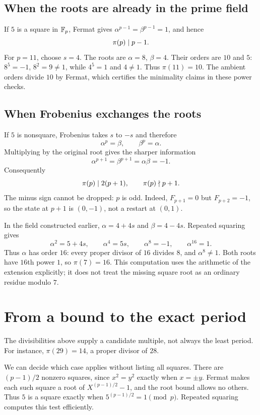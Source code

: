 \subsection*{When the roots are already in the prime field}

If $5$ is a square in $\mathbb F_p$, Fermat gives
$\alpha^{p-1}=\beta^{p-1}=1$, and hence
\[
 \pi(p)\mid p-1.
\]
For $p=11$, choose $s=4$. The roots are $\alpha=8$, $\beta=4$.
Their orders are $10$ and $5$: $8^5=-1$, $8^2=9\ne1$, while
$4^5=1$ and $4\ne1$. Thus $\pi(11)=10$.
The ambient orders divide $10$ by Fermat, which certifies the minimality
claims in these power checks.

\subsection*{When Frobenius exchanges the roots}

If $5$ is nonsquare, Frobenius takes $s$ to $-s$ and therefore
\[
 \alpha^p=\beta,\qquad\beta^p=\alpha.
\]
Multiplying by the original root gives the sharper information
\[
 \alpha^{p+1}=\beta^{p+1}=\alpha\beta=-1.
\]
Consequently
\[
 \pi(p)\mid2(p+1),\qquad \pi(p)\nmid p+1.
\]
The minus sign cannot be dropped: $p$ is odd.
Indeed, $F_{p+1}=0$ but $F_{p+2}=-1$, so the state at $p+1$ is
$(0,-1)$, not a restart at $(0,1)$.

\begin{example}
In the field constructed earlier, $\alpha=4+4s$ and $\beta=4-4s$.
Repeated squaring gives
\[
 \alpha^2=5+4s,\qquad \alpha^4=5s,\qquad
 \alpha^8=-1,\qquad\alpha^{16}=1.
\]
Thus $\alpha$ has order $16$: every proper divisor of $16$ divides $8$,
and $\alpha^8\ne1$. Both roots have $16$th power $1$, so
$\pi(7)=16$. This computation uses the arithmetic of the extension
explicitly; it does not treat the missing square root as an ordinary
residue modulo $7$.
\end{example}

\section{From a bound to the exact period}
\label{sec:exact-fibonacci-period}

The divisibilities above supply a candidate multiple, not always the
least period. For instance, $\pi(29)=14$, a proper divisor of $28$.

We can decide which case applies without listing all squares.
There are $(p-1)/2$ nonzero squares, since $x^2=y^2$ exactly when
$x=\pm y$. Fermat makes each such square a root of
$X^{(p-1)/2}-1$, and the root bound allows no others.
Thus $5$ is a square exactly when $5^{(p-1)/2}=1\pmod p$.
Repeated squaring computes this test efficiently.

